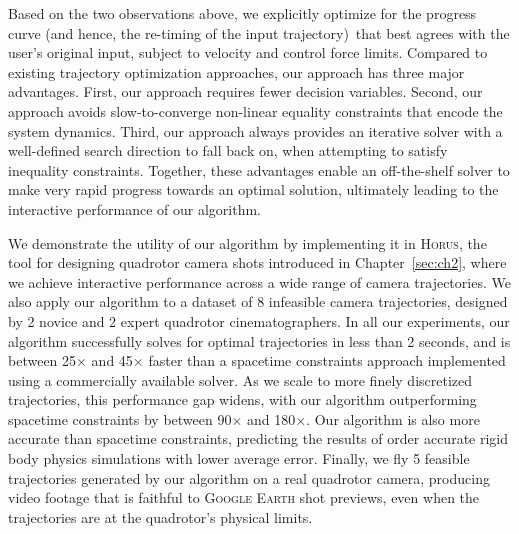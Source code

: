 Based on the two observations above, we explicitly optimize for the progress curve (and hence, the re-timing of the input trajectory)\ that best agrees with the user's original input, subject to velocity and control force limits.
Compared to existing trajectory optimization approaches, our approach has three major advantages. First, our approach requires fewer decision variables.
Second, our approach avoids slow-to-converge non-linear equality constraints that encode the system dynamics.
Third, our approach always provides an iterative solver with a well-defined search direction to fall back on, when attempting to satisfy inequality constraints.
Together, these advantages enable an off-the-shelf solver to make very rapid progress towards an optimal solution, ultimately leading to the interactive performance of our algorithm.

We demonstrate the utility of our algorithm by implementing it in \textsc{Horus}, the tool for designing quadrotor camera shots introduced in Chapter~\ref{sec:ch2}, where we achieve interactive performance across a wide range of camera trajectories.
We also apply our algorithm to a dataset of 8 infeasible camera trajectories, designed by 2 novice and 2 expert quadrotor cinematographers.
In all our experiments, our algorithm successfully solves for optimal trajectories in less than 2 seconds, and is between 25$\times$ and 45$\times$ faster than a spacetime constraints approach implemented using a commercially available solver.
As we scale to more finely discretized trajectories, this performance gap widens, with our algorithm outperforming spacetime constraints by between 90$\times$ and 180$\times$.
Our algorithm is also more accurate than spacetime constraints, predicting the results of  order accurate rigid body physics simulations with lower average error.
Finally, we fly 5 feasible trajectories generated by our algorithm on a real quadrotor camera, producing video footage that is faithful to \textsc{Google Earth} shot previews, even when the trajectories are at the quadrotor's physical limits.
